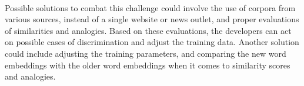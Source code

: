 \documentclass[a4paper, 11pt]{article}
\begin{document}
\noindent{}\\	

Possible solutions to combat this challenge could involve the use of corpora from various sources, instead of a single website or news outlet, and proper evaluations of similarities and analogies. Based on these evaluations, the developers can act on possible cases of discrimination and adjust the training data. Another solution could include adjusting the training parameters, and comparing the new word embeddings with the older word embeddings when it comes to similarity scores and analogies.



\end{document}
